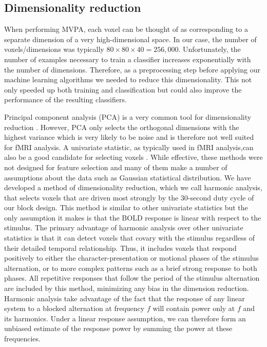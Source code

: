 \documentclass[authoryear]{elsarticle}
\begin{document}
\subsection{Dimensionality reduction}
When performing MVPA, each voxel can be thought of as corresponding to a separate dimension of a very high-dimensional space.
In our case, the number of voxels/dimensions was typically $80 \times 80 \times 40 = 256,000$.
Unfortunately, the number of examples necessary to train a classifier increases exponentially with the number of dimensions.
Therefore, as a preprocessing step before applying our machine learning algorithms we needed to reduce this dimensionality.
This not only speeded up both training and classification but could also improve the performance of the resulting classifiers.

Principal component analysis (PCA) is a very common tool for dimensionality reduction \citep{Hotelling1933}.
However, PCA only selects the orthogonal dimensions with the highest variance which is very likely to be noise and is therefore not well suited for fMRI analysis.
A univariate statistic, as typically used in  fMRI analysis,can also be a good candidate for selecting voxels \citep{Norman2006,Pereira2009}.
While effective, these methods were not designed for feature selection and many of them make a number of assumptions about the data such as Gaussian statistical distribution.
We have developed a method of dimensionality reduction, which we call harmonic analysis, that selects voxels that are driven most strongly by the 30-second duty cycle of our block design.
This method is similar to other univariate statistics but the only assumption it makes is that the BOLD response is linear with respect to the stimulus.
The primary advantage  of harmonic analysis over other univariate statistics is that it can detect voxels that covary with the stimulus regardless of their detailed temporal relationship. Thus, it includes voxels that respond positively to either the character-presentation or motional phases of the stimulus alternation, or to more complex patterns such as a brief strong response to both phases. All repetitive responses that follow the period of the stimulus alternation are included by this method, minimizing any bias in the dimension reduction.
Harmonic analysis take advantage of the fact that the response of any linear system to a blocked alternation at frequency $f$ will contain power only at $f$ and its harmonics. 
Under a linear response assumption, we can therefore form an unbiased estimate of the response power by summing the power at these frequencies. 
\end{document}
